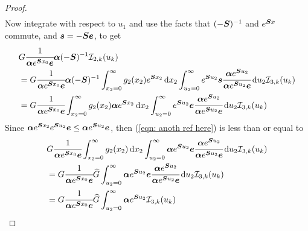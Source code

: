 \begin{proof}
\begin{align}
	\end{align}
	Now integrate with respect to \(u_1\) and use the facts that \((-\boldsymbol{S})^{-1}\) and \(e^{\boldsymbol{S}x}\) commute, and \(\boldsymbol s = - \boldsymbol{S} \boldsymbol e \), to get 
	\begin{align}
		& G  \cfrac{1}{\boldsymbol \alpha e^{\boldsymbol{S}x_0}\boldsymbol e} \boldsymbol \alpha (-\boldsymbol{S})^{-1}  \mathcal I_{2,k}(u_k) \label{eqn: rep from here}
		\\& = G  \cfrac{1}{\boldsymbol \alpha e^{\boldsymbol{S}x_0}\boldsymbol e}  \boldsymbol \alpha (-\boldsymbol{S})^{-1} \int_{x_2=0}^\infty g_2(x_2)  e^{\boldsymbol{S}x_2} \, \mathrm{d} x_2 \int_{u_2=0}^\infty e^{\boldsymbol{S}u_2}\boldsymbol s \cfrac{\boldsymbol \alpha e^{\boldsymbol{S}u_2}}{\boldsymbol \alpha e^{\boldsymbol{S}u_2}\boldsymbol e}\, \mathrm{d} u_2 \mathcal I_{3,k}(u_k)\nonumber
		\\& = G  \cfrac{1}{\boldsymbol \alpha e^{\boldsymbol{S}x_0}\boldsymbol e}  \int_{x_2=0}^\infty g_2(x_2) \boldsymbol \alpha e^{\boldsymbol{S}x_2} \, \mathrm{d} x_2 \int_{u_2=0} ^\infty e^{\boldsymbol{S}u_2}\boldsymbol e \cfrac{\boldsymbol \alpha e^{\boldsymbol{S}u_2}}{\boldsymbol \alpha e^{\boldsymbol{S}u_2}\boldsymbol e}\, \mathrm{d} u_2 \mathcal I_{3,k}(u_k)\label{eqn: anoth ref here}
	\end{align}
	Since \(\boldsymbol \alpha e^{\boldsymbol{S}x_2}e^{\boldsymbol{S}u_2}\boldsymbol e \leq \boldsymbol \alpha e^{\boldsymbol{S}u_2}\boldsymbol e \), then (\ref{eqn: anoth ref here}) is less than or equal to 
	\begin{align}
		& G  \cfrac{1}{\bs \alpha e^{\bs{S}x_0}\bs e}  \int_{x_2=0}^\infty g_2(x_2) \wrt x_2 \int_{u_2=0}^\infty \bs \alpha e^{\bs{S}u_2}\bs e \cfrac{\bs \alpha e^{\bs{S}u_2}}{\bs \alpha e^{\bs{S}u_2}\bs e}\wrt u_2 \mathcal I_{3,k}(u_k) \nonumber
		\\& =G  \cfrac{1}{\bs \alpha e^{\bs{S}x_0 }\bs e}  \widehat G  \int_{u_2=0}^\infty \bs \alpha e^{\bs{S}u_2}\bs e \cfrac{\bs \alpha e^{\bs{S}u_2}}{\bs \alpha e^{\bs{S}u_2}\bs e}\wrt u_2 \mathcal I_{3,k}(u_k) \nonumber
		\\& =G  \cfrac{1}{\bs \alpha e^{\bs{S} x_0 }\bs e}  \widehat G  \int_{u_2=0}^\infty \bs \alpha e^{\bs{S}u_2} \mathcal I_{3,k}(u_k) \nonumber

\end{align}
\end{proof}
